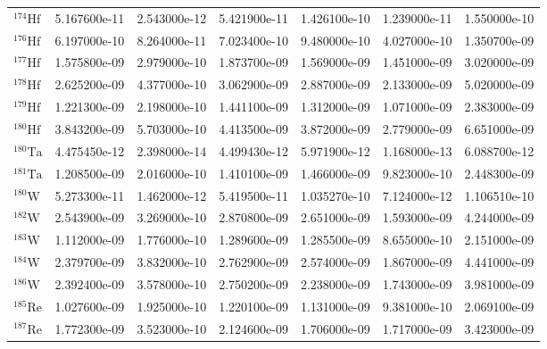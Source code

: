 \begin{tabular}{lrrrrrr}
$^{174}\mathrm{Hf}$ &       5.167600e-11 &      2.543000e-12 &      5.421900e-11 &       1.426100e-10 &      1.239000e-11 &      1.550000e-10 \\
$^{176}\mathrm{Hf}$ &       6.197000e-10 &      8.264000e-11 &      7.023400e-10 &       9.480000e-10 &      4.027000e-10 &      1.350700e-09 \\
$^{177}\mathrm{Hf}$ &       1.575800e-09 &      2.979000e-10 &      1.873700e-09 &       1.569000e-09 &      1.451000e-09 &      3.020000e-09 \\
$^{178}\mathrm{Hf}$ &       2.625200e-09 &      4.377000e-10 &      3.062900e-09 &       2.887000e-09 &      2.133000e-09 &      5.020000e-09 \\
$^{179}\mathrm{Hf}$ &       1.221300e-09 &      2.198000e-10 &      1.441100e-09 &       1.312000e-09 &      1.071000e-09 &      2.383000e-09 \\
$^{180}\mathrm{Hf}$ &       3.843200e-09 &      5.703000e-10 &      4.413500e-09 &       3.872000e-09 &      2.779000e-09 &      6.651000e-09 \\
$^{180}\mathrm{Ta}$ &       4.475450e-12 &      2.398000e-14 &      4.499430e-12 &       5.971900e-12 &      1.168000e-13 &      6.088700e-12 \\
$^{181}\mathrm{Ta}$ &       1.208500e-09 &      2.016000e-10 &      1.410100e-09 &       1.466000e-09 &      9.823000e-10 &      2.448300e-09 \\
$^{180}\mathrm{W}$  &       5.273300e-11 &      1.462000e-12 &      5.419500e-11 &       1.035270e-10 &      7.124000e-12 &      1.106510e-10 \\
$^{182}\mathrm{W}$  &       2.543900e-09 &      3.269000e-10 &      2.870800e-09 &       2.651000e-09 &      1.593000e-09 &      4.244000e-09 \\
$^{183}\mathrm{W}$  &       1.112000e-09 &      1.776000e-10 &      1.289600e-09 &       1.285500e-09 &      8.655000e-10 &      2.151000e-09 \\
$^{184}\mathrm{W}$  &       2.379700e-09 &      3.832000e-10 &      2.762900e-09 &       2.574000e-09 &      1.867000e-09 &      4.441000e-09 \\
$^{186}\mathrm{W}$  &       2.392400e-09 &      3.578000e-10 &      2.750200e-09 &       2.238000e-09 &      1.743000e-09 &      3.981000e-09 \\
$^{185}\mathrm{Re}$ &       1.027600e-09 &      1.925000e-10 &      1.220100e-09 &       1.131000e-09 &      9.381000e-10 &      2.069100e-09 \\
$^{187}\mathrm{Re}$ &       1.772300e-09 &      3.523000e-10 &      2.124600e-09 &       1.706000e-09 &      1.717000e-09 &      3.423000e-09 \\

\end{tabular}
